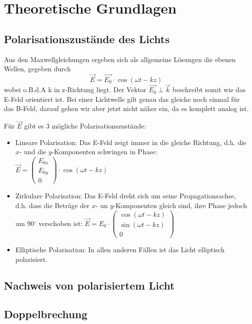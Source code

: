 \section{Theoretische Grundlagen}

\subsection{Polarisationszustände des Lichts}

Aus den Maxwellgleichungen ergeben sich als allgemeine Lösungen die ebenen Wellen, gegeben durch
$$\vec E = \vec{E_0}\cdot \cos(\omega t - kz)$$
wobei o.B.d.A k in z-Richtung liegt. Der Vektor $\vec{E_0} \perp \vec k$ beschreibt somit wie das E-Feld orientiert ist. Bei einer Lichtwelle gilt genau das gleiche noch einmal für das B-Feld, darauf gehen wir aber jetzt nicht näher ein, da es komplett analog ist.

Für $\vec{E}$ gibt es 3 mögliche Polarisationszustände:

\begin{itemize}

\item Lineare Polarisation: Das E-Feld zeigt immer in die gleiche Richtung, d.h. die $x$- und die $y$-Komponenten schwingen in Phase:
$ \vec{E} = \begin{pmatrix} E_{0x} \\ E_{0y} \\ 0 \end{pmatrix}\cdot\cos(\omega t-kz) $

\item Zirkulare Polarisation: Das E-Feld dreht sich um seine Propagationsachse, d.h. dass die Beträge der $x$- un $y$-Komponenten gleich sind, ihre Phase jedoch um 90$^\circ$ verschoben ist:
$\vec{E}= E_0\cdot \begin{pmatrix} \cos(\omega t - kz) \\ \sin(\omega t - kz) \\ 0 \end{pmatrix}$

\item Elliptische Polarisation: In allen anderen Fällen ist das Licht elliptisch polarisiert.
\end{itemize}

\subsection{Nachweis von polarisiertem Licht}


\subsection{Doppelbrechung}

